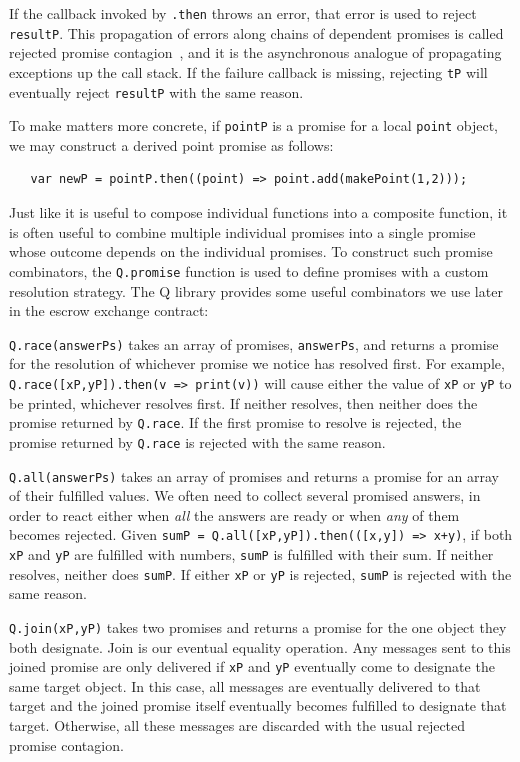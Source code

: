 \documentclass{llncs}
\begin{document}
If the callback invoked by {\tt .then} throws an error, that error is used to reject {\tt resultP}. This propagation of errors along chains of dependent promises is called rejected promise contagion~\cite{miller:strangers}, and it is the asynchronous analogue of propagating exceptions up the call stack. If the failure callback is missing,  rejecting {\tt tP} will eventually reject {\tt resultP} with the same reason.

To make matters more concrete, if {\tt pointP} is a promise for a local {\tt point} object, we may construct a derived point promise as follows:

\begin{verbatim}
   var newP = pointP.then((point) => point.add(makePoint(1,2)));
\end{verbatim}

Just like it is useful to compose individual functions into a composite function, it is often useful to combine multiple individual promises into a single promise whose outcome depends on the individual promises. To construct such promise combinators, the {\tt Q.promise} function is used to define promises with a custom resolution strategy. The Q library provides some useful combinators we use later in the escrow exchange contract:

\begin{description*}
\item[{\tt Q.race(answerPs)}] takes an array of promises, {\tt answerPs}, and returns a promise for the resolution of whichever promise we notice has resolved first. For example, {\tt Q.race([xP,yP]).then(v => print(v))} will cause either the value of {\tt xP} or {\tt yP} to be printed, whichever resolves first. If neither resolves, then neither does the promise returned by {\tt Q.race}. If the first promise to resolve is rejected, the promise returned by {\tt Q.race} is rejected with the same reason.

\item[{\tt Q.all(answerPs)}] takes an array of promises and returns a promise for an array of their fulfilled values. We often need to collect several promised answers, in order to react either when \emph{all} the answers are ready or when \emph{any} of them becomes rejected. Given {\tt sumP = Q.all([xP,yP]).then(([x,y]) => x+y)}, if both {\tt xP} and {\tt yP} are fulfilled with numbers, {\tt sumP} is fulfilled with their sum. If neither resolves, neither does {\tt sumP}. If either {\tt xP} or {\tt yP} is rejected, {\tt sumP} is rejected with the same reason.

\item[{\tt Q.join(xP,yP)}] takes two promises and returns a promise for the one object they both designate. Join is our eventual equality operation. Any messages sent to this joined promise are only delivered if {\tt xP} and {\tt yP} eventually come to designate the same target object. In this case, all messages are eventually delivered to that target and the joined promise itself eventually becomes fulfilled to designate that target. Otherwise, all these messages are discarded with the usual rejected promise contagion.
\end{description*}
\end{document}
